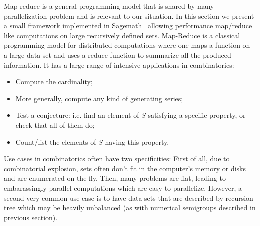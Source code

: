 \documentclass{deliverablereport}
\begin{document}
Map-reduce is a general programming model that is shared by many
parallelization problem and is relevant to our situation. In this section we
present a small framework implemented in Sagemath~\cite{sage} allowing
performance map/reduce like computations on
large recursively defined sets. Map-Reduce is a classical programming model
for distributed computations where one maps a function on a large data set and
uses a reduce function to summarize all the produced information. It has a
large range of intensive applications in combinatorics:
\begin{itemize}
  \item Compute the cardinality;
  \item More generally, compute any kind of generating series;
  \item Test a conjecture: i.e. find an element of $S$ satisfying a specific
    property, or check that all of them do;
  \item Count/list the elements of $S$ having this property.
\end{itemize}
Use cases in combinatorics often have two specificities: First of all, due to
combinatorial explosion, sets often don't fit in the computer's memory or
disks and are enumerated on the fly. Then, many problems are flat, leading to
embarassingly parallel computations which are easy to parallelize. However, a
second very common use case is to have data sets that are described by
recursion tree which may be heavily unbalanced (as with numerical semigroups
described in previous section).
\end{document}
